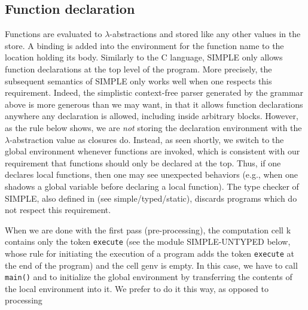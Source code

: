 \documentclass{article}
\begin{document}
\begin{kdefinition}
\begin{module}{}
\begin{kblock}[text]
 \subsection{Function declaration}
Functions are evaluated to $\lambda$-abstractions and stored like any other
values in the store.  A binding is added into the environment for the function
name to the location holding its body.  Similarly to the C language, SIMPLE
only allows function declarations at the top level of the program.  More
precisely, the subsequent semantics of SIMPLE only works well when one
respects this requirement.  Indeed, the simplistic context-free parser
generated by the grammar above is more generous than we may want, in that it
allows function declarations anywhere any declaration is allowed, including
inside arbitrary blocks.  However, as the rule below shows, we are {\em not}
storing the declaration environment with the $\lambda$-abstraction value as
closures do.  Instead, as seen shortly, we switch to the global environment
whenever functions are invoked, which is consistent with our requirement that
functions should only be declared at the top.  Thus, if one declares local
functions, then one may see unexpected behaviors (e.g., when one shadows a
global variable before declaring a local function).  The type checker of
SIMPLE, also defined in \K (see simple/typed/static),
discards programs which do not respect this requirement. \end{kblock}
\begin{kblock}[text]
 When we are done with the first pass (pre-processing), the computation
cell \textsf{k} contains only the token \texttt{execute} (see the module
SIMPLE-UNTYPED below, whose rule for initiating the execution of a program
adds the token \texttt{execute} at the end of the program) and the cell
\textsf{genv} is empty.  In this case, we have to call \texttt{main()} and to
initialize the global environment by transferring the contents of the local
environment into it.  We prefer to do it this way, as opposed to processing

\end{kblock}
\end{module}
\end{kdefinition}
\end{document}
